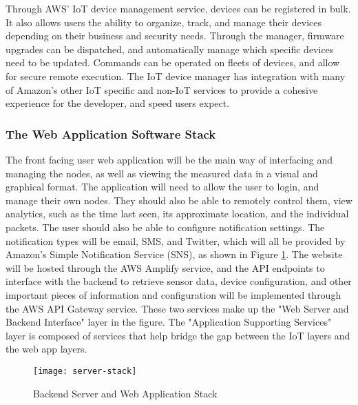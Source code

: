 Through AWS' IoT device management service, devices can be registered in bulk.
It also allows users the ability to organize, track, and manage their devices
depending on their business and security needs. Through the manager, firmware
upgrades can be dispatched, and automatically manage which specific devices need
to be updated. Commands can be operated on fleets of devices, and allow for
secure remote execution. The IoT device manager has integration with many of
Amazon's other IoT specific and non-IoT services to provide a cohesive
experience for the developer, and speed users expect.



\subsubsection{The Web Application Software Stack}
The front facing user web application will be the main way of interfacing and
managing the nodes, as well as viewing the measured data in a visual and
graphical format. The application will need to allow the user to login, and
manage their own nodes. They should also be able to remotely control them, view
analytics, such as the time last seen, its approximate location, and the
individual packets. The user should also be able to configure notification
settings. The notification types will be email, SMS, and Twitter, which will all
be provided by Amazon's Simple Notification Service (SNS), as shown in Figure
\ref{server-stack}. The website will be hosted through the AWS Amplify service,
and the API endpoints to interface with the backend to retrieve sensor data,
device configuration, and other important pieces of information and
configuration will be implemented through the AWS API Gateway service. These two
services make up the "Web Server and Backend Interface" layer in the figure. The
"Application Supporting Services" layer is composed of services that help bridge
the gap between the IoT layers and the web app layers. 


\begin{figure}
  \centering
  \texttt{[image: server-stack]}
  \caption{Backend Server and Web Application Stack}
  \label{server-stack}
\end{figure}
